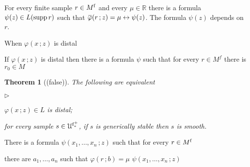 \documentclass[10pt,openany]{article}
\newcommand{\mylabel}[1]{{\ssf{#1}}\hfill}
\renewenvironment{itemize}
  {\begin{list}{$\triangleright$}{%
   \setlength{\parskip}{0mm}
   \setlength{\topsep}{.4\baselineskip}
   \setlength{\rightmargin}{0mm}
   \setlength{\listparindent}{0mm}
   \setlength{\itemindent}{0mm}
   \setlength{\labelwidth}{3ex}
   \setlength{\itemsep}{.4\baselineskip}
   \setlength{\parsep}{0mm}
   \setlength{\partopsep}{0mm}
   \setlength{\labelsep}{1ex}
   \setlength{\leftmargin}{\labelwidth+\labelsep}
   \let\makelabel\mylabel}}{%
   \end{list}\vspace*{-\parskip}}
\def\RR{\mathds R}
\def\supp{\mathop{\rm supp}}
\newcommand{\sbar}[1]{\mkern 1.8mu\overline{\mkern-1.8mu#1\mkern-1mu}\mkern 1mu}
\def\iff{\leftrightarrow}
\def\U{\EuScript U}
\def\phi{\varphi}
\def\ssf#1{\textsf{\small #1}}
\newcounter{thm}[section]
\theoremstyle{mio}
\newtheorem{theorem}[thm]{Theorem}
\theoremstyle{liscio}
\begin{document}
For every finite sample $r\in M^{\rm f}$ and every $\mu\in\RR$ there is a formula $\psi(z)\in L(\supp r)$ such that $\sbar\phi(r\,;z)=\mu \iff \psi(z)$. The formula $\psi(z)$ depends on $r$.

When $\phi(x\,;z)$ is distal 


If  $\phi(x\,;z)$ is distal then there is a formula $\psi$ such that  for every $r\in M^f$ there is $r_0\in M^{}$

\begin{theorem}[(false)]
  The following are equivalent
  \begin{itemize}
    \item[1.] $\phi(x\,;z)\in L$ is distal;
    \item[2.] for every sample $s\in\U^{\rm f^+_*}$, if $s$ is generically stable then $s$ is smooth.

  \end{itemize}
\end{theorem}

There is a formula $\psi(x_1,\dots,x_n\,;z)$ such that for every $r\in M^{\rm f}$ 

there are $a_1,\dots,a_n$ such that $\phi(r\,;b)=\mu$ $\psi(x_1,\dots,x_n\,;z)$
\end{document}
